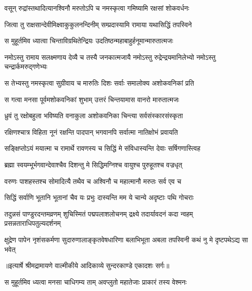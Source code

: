 \twolineshloka
{वसून् रुद्रांस्तथादित्यानश्विनौ मरुतोऽपि च}
{नमस्कृत्वा गमिष्यामि रक्षसां शोकवर्धनः} %

\twolineshloka
{जित्वा तु राक्षसान्देवीमिक्ष्वाकुकुलनन्दिनीम्}
{सम्प्रदास्यामि रामाया यथासिद्धिं तपस्विने} %

\twolineshloka
{स मुहूर्तमिव ध्यात्वा चिन्ताविग्रथितेन्द्रियः}
{उदतिष्ठन्महाबाहुर्हनूमान्मारुतात्मजः} %

\fourlineindentedshloka
{नमोऽस्तु रामाय सलक्ष्मणाय}
{देव्यै च तस्यै जनकात्मजायै}
{नमोऽस्तु रुद्रेन्द्रयमानिलेभ्यो}
{नमोऽस्तु चन्द्रार्कमरुद्गणेभ्यः} %

\twolineshloka
{स तेभ्यस्तु नमस्कृत्वा सुग्रीवाय च मारुतिः}
{दिशः सर्वाः समालोक्य अशोकवनिकां प्रति} %

\twolineshloka
{स गत्वा मनसा पूर्वमशोकवनिकां शुभाम्}
{उत्तरं चिन्तयामास वानरो मारुतात्मजः} %

\twolineshloka
{ध्रुवं तु रक्षोबहुला भविष्यति वनाकुला}
{अशोकवनिका चिन्त्या सर्वसंस्कारसंस्कृता} %

\twolineshloka
{रक्षिणश्चात्र विहिता नूनं रक्षन्ति पादपान्}
{भगवानपि सर्वात्मा नातिक्षोभं प्रवायति} %

\twolineshloka
{सङ्क्षिप्तोऽयं मयात्मा च रामार्थे रावणस्य च}
{सिद्धिं मे संविधास्यन्ति देवाः सर्षिगणास्त्विह} %

\twolineshloka
{ब्रह्मा स्वयम्भूर्भगवान्देवाश्चैव दिशन्तु मे}
{सिद्धिमग्निश्च वायुश्च पुरुहूतश्च वज्रधृत्} %

\twolineshloka
{वरुणः पाशहस्तश्च सोमादित्यै तथैव च}
{अश्विनौ च महात्मानौ मरुतः सर्व एव च} %

\twolineshloka
{सिद्धिं सर्वाणि भूतानि भूतानां चैव यः प्रभुः}
{दास्यन्ति मम ये चान्ये अदृष्टाः पथि गोचराः} %

\fourlineindentedshloka
{तदुन्नसं पाण्डुरदन्तमव्रणम्}
{शुचिस्मितं पद्मपलाशलोचनम्}
{द्रक्ष्ये तदार्यावदनं कदा न्वहम्}
{प्रसन्नताराधिपतुल्यदर्शनम्} %

\fourlineindentedshloka
{क्षुद्रेण पापेन नृशंसकर्मणा}
{सुदारुणालाङ्कृतवेषधारिणा}
{बलाभिभूता अबला तपस्विनी}
{कथं नु मे दृष्टपथेऽद्य सा भवेत्} %


{॥इत्यार्षे श्रीमद्रामायणे वाल्मीकीये आदिकाव्ये सुन्दरकाण्डे एकादशः सर्गः॥}


\twolineshloka
{स मुहूर्तमिव ध्यत्वा मनसा चाधिगम्य ताम्}
{अवप्लुतो महातेजाः प्राकारं तस्य वेश्मनः} %

